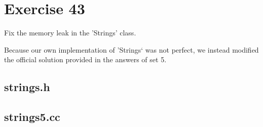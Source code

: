 \section{Exercise 43}
\begin{question}
    Fix the memory leak in the 'Strings' class.
\end{question}

\begin{solution}
    Because our own implementation of 'Strings` was not perfect, we instead modified the official solution provided in the answers of set 5. 

    \subsection{strings.h}
    \vspace{20pt}
    \subsection{strings5.cc}
\end{solution}
